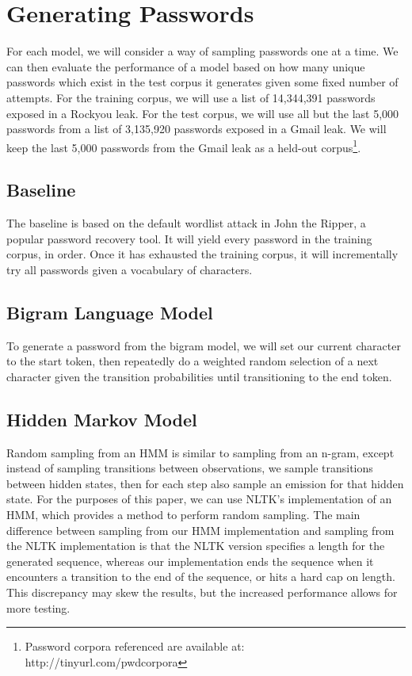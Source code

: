 \documentclass{amsart}
\theoremstyle{definition}
\theoremstyle{remark}
\numberwithin{equation}{section}
\begin{document}
\section{Generating Passwords}
For each model, we will consider a way of sampling passwords one at a time. We can then evaluate the performance of a model based on how many unique passwords which exist in the test corpus it generates given some fixed number of attempts. For the training corpus, we will use a list of 14,344,391 passwords exposed in a Rockyou leak. For the test corpus, we will use all but the last 5,000 passwords from a list of 3,135,920 passwords exposed in a Gmail leak. We will keep the last 5,000 passwords from the Gmail leak as a held-out corpus\footnote{Password corpora referenced are available at: http://tinyurl.com/pwdcorpora}.
\subsection{Baseline}
The baseline is based on the default wordlist attack in John the Ripper, a popular password recovery tool. It will yield every password in the training corpus, in order. Once it has exhausted the training corpus, it will incrementally try all passwords given a vocabulary of characters.
\subsection{Bigram Language Model}
To generate a password from the bigram model, we will set our current character to the start token, then repeatedly do a weighted random selection of a next character given the transition probabilities until transitioning to the end token.
\subsection{Hidden Markov Model}
Random sampling from an HMM is similar to sampling from an n-gram, except instead of sampling transitions between observations, we sample transitions between hidden states, then for each step also sample an emission for that hidden state. For the purposes of this paper, we can use NLTK's implementation of an HMM, which provides a method to perform random sampling. The main difference between sampling from our HMM implementation and sampling from the NLTK implementation is that the NLTK version specifies a length for the generated sequence, whereas our implementation ends the sequence when it encounters a transition to the end of the sequence, or hits a hard cap on length. This discrepancy may skew the results, but the increased performance allows for more testing.
\end{document}
